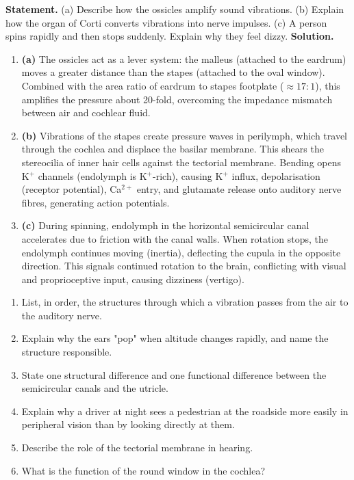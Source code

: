 \documentclass[11pt]{article}
\begin{document}
\begin{exoresolu}
\textbf{Statement.} (a) Describe how the ossicles amplify sound vibrations. (b) Explain how the organ of Corti converts vibrations into nerve impulses. (c) A person spins rapidly and then stops suddenly. Explain why they feel dizzy.
\tcblower
\textbf{Solution.}
\begin{enumerate}
\item \textbf{(a)} The ossicles act as a lever system: the malleus (attached to the eardrum) moves a greater distance than the stapes (attached to the oval window). Combined with the area ratio of eardrum to stapes footplate ($\approx 17:1$), this amplifies the pressure about 20-fold, overcoming the impedance mismatch between air and cochlear fluid.
\item \textbf{(b)} Vibrations of the stapes create pressure waves in perilymph, which travel through the cochlea and displace the basilar membrane. This shears the stereocilia of inner hair cells against the tectorial membrane. Bending opens K$^+$ channels (endolymph is K$^+$-rich), causing K$^+$ influx, depolarisation (receptor potential), Ca$^{2+}$ entry, and glutamate release onto auditory nerve fibres, generating action potentials.
\item \textbf{(c)} During spinning, endolymph in the horizontal semicircular canal accelerates due to friction with the canal walls. When rotation stops, the endolymph continues moving (inertia), deflecting the cupula in the opposite direction. This signals continued rotation to the brain, conflicting with visual and proprioceptive input, causing dizziness (vertigo).
\end{enumerate}
\end{exoresolu}

\begin{exercice}
\begin{enumerate}
\item List, in order, the structures through which a vibration passes from the air to the auditory nerve.
\item Explain why the ears "pop" when altitude changes rapidly, and name the structure responsible.
\item State one structural difference and one functional difference between the semicircular canals and the utricle.
\item Explain why a driver at night sees a pedestrian at the roadside more easily in peripheral vision than by looking directly at them.
\item Describe the role of the tectorial membrane in hearing.
\item What is the function of the round window in the cochlea?
\end{enumerate}
\end{exercice}
\end{document}
